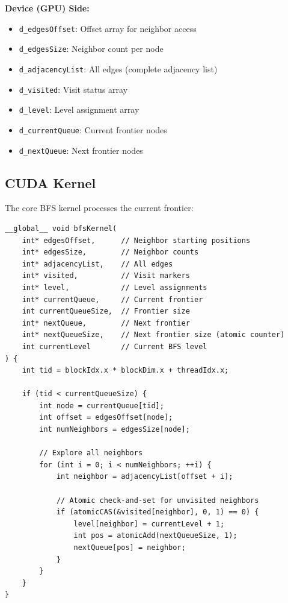 \documentclass[11pt,a4paper]{article}
\begin{document}
\textbf{Device (GPU) Side:}
\begin{itemize}
    \item \texttt{d\_edgesOffset}: Offset array for neighbor access
    \item \texttt{d\_edgesSize}: Neighbor count per node
    \item \texttt{d\_adjacencyList}: All edges (complete adjacency list)
    \item \texttt{d\_visited}: Visit status array
    \item \texttt{d\_level}: Level assignment array
    \item \texttt{d\_currentQueue}: Current frontier nodes
    \item \texttt{d\_nextQueue}: Next frontier nodes
\end{itemize}

\subsection{CUDA Kernel}

The core BFS kernel processes the current frontier:

\begin{lstlisting}[caption={BFS CUDA Kernel (Baseline)}]
__global__ void bfsKernel(
    int* edgesOffset,      // Neighbor starting positions
    int* edgesSize,        // Neighbor counts
    int* adjacencyList,    // All edges
    int* visited,          // Visit markers
    int* level,            // Level assignments
    int* currentQueue,     // Current frontier
    int currentQueueSize,  // Frontier size
    int* nextQueue,        // Next frontier
    int* nextQueueSize,    // Next frontier size (atomic counter)
    int currentLevel       // Current BFS level
) {
    int tid = blockIdx.x * blockDim.x + threadIdx.x;
    
    if (tid < currentQueueSize) {
        int node = currentQueue[tid];
        int offset = edgesOffset[node];
        int numNeighbors = edgesSize[node];
        
        // Explore all neighbors
        for (int i = 0; i < numNeighbors; ++i) {
            int neighbor = adjacencyList[offset + i];
            
            // Atomic check-and-set for unvisited neighbors
            if (atomicCAS(&visited[neighbor], 0, 1) == 0) {
                level[neighbor] = currentLevel + 1;
                int pos = atomicAdd(nextQueueSize, 1);
                nextQueue[pos] = neighbor;
            }
        }
    }
}
\end{lstlisting}
\end{document}

